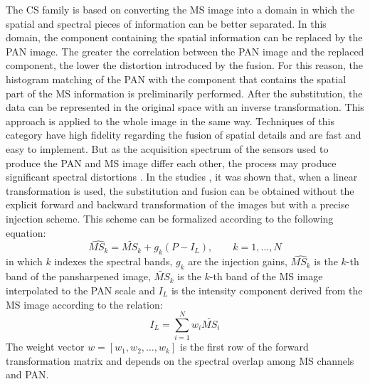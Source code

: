 \documentclass[12pt]{report}
\begin{document}
The CS family is based on converting the MS image into a domain in which the spatial and spectral pieces of information can be better separated. In this domain, the component containing the spatial information can be replaced by the PAN image. The greater the correlation between the PAN image and the replaced component, the lower the distortion introduced by the fusion. For this reason, the histogram matching of the PAN with the component that contains the spatial part of the MS information is preliminarily performed.
After the substitution, the data can be represented in the original space with an inverse transformation. This approach is applied to the whole image in the same way. Techniques of this category have high fidelity regarding the fusion of spatial details and are fast and easy to implement. But as the acquisition spectrum of the sensors used to produce the PAN and MS image differ each other, the process may produce significant spectral distortions \cite{cs1} \cite{cs2}. 
In the studies \cite{cs3} \cite{cs4} \cite{cs5} \cite{cs6} \cite{cs7}, it was shown that, when a linear transformation is used, the substitution and fusion can be obtained without the explicit forward and backward transformation of the images but with a precise injection scheme. This scheme can be formalized according to the following equation:
\begin{equation}
    \widehat{MS_k} = \widetilde{MS_k} + g_k(P - I_L), \qquad k = 1,\dots,N
    \label{cs}
\end{equation}
%
in which $k$ indexes the spectral bands, $g_k$ are the injection gains, $\widehat{MS_k}$ is the $k$-th band of the pansharpened image, $\widetilde{MS}_k$ is the $k$-th band of the MS image interpolated to the PAN scale and $I_L$ is the intensity component derived from the MS image according to the relation:
% 
\begin{equation}
    I_L = \sum_{i=1}^{N} w_i\widetilde{MS_i}
    \label{ilcs}
\end{equation}
%
The weight vector $w= [w_1,w_2, \ldots,w_k] $ is the first row of the forward transformation matrix and depends on the spectral overlap among MS channels and PAN.
 
\end{document}
